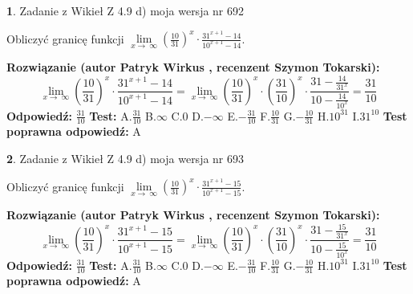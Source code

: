 \documentclass[12pt, a4paper]{article}
\theoremstyle{definition} %
\newtheorem{zad}{}
\newcommand{\zadStart}[1]{\begin{zad}#1\newline}
\newcommand{\zadStop}{\end{zad}}
\newcommand{\rozwStart}[2]{\noindent \textbf{Rozwiązanie (autor #1 , recenzent #2): }\newline}
\newcommand{\rozwStop}{\newline}
\newcommand{\odpStart}{\noindent \textbf{Odpowiedź:}\newline}
\newcommand{\odpStop}{\newline}
\newcommand{\testStart}{\noindent \textbf{Test:}\newline}
\newcommand{\testStop}{\newline}
\newcommand{\kluczStart}{\noindent \textbf{Test poprawna odpowiedź:}\newline}
\newcommand{\kluczStop}{\newline}
\begin{document}
\zadStart{Zadanie z Wikieł Z 4.9 d) moja wersja nr 692}


Obliczyć granicę funkcji  $\lim\limits_{x\to\ \infty}(\frac{10}{31})^{x}\cdot\frac{31^{x+1}-14}{10^{x+1}-14}$.
\zadStop
\rozwStart{Patryk Wirkus}{Szymon Tokarski}
$$\lim\limits_{x\to\ \infty}(\frac{10}{31})^{x}\cdot\frac{31^{x+1}-14}{10^{x+1}-14}=\lim\limits_{x\to\ \infty}(\frac{10}{31})^{x}\cdot(\frac{31}{10})^{x} \cdot \frac{31-\frac{14}{31^{x}}}{10-\frac{14}{10^{x}}} = \frac{31}{10}$$
\rozwStop
\odpStart
$\frac{31}{10}$
\odpStop
\testStart
A.$\frac{31}{10}$ B.$\infty$ C.$0$ D.$-\infty$ E.$-\frac{31}{10}$
F.$\frac{10}{31}$ G.$-\frac{10}{31}$
H.$10^{31}$
I.$31^{10}$
\testStop
\kluczStart
A
\kluczStop



\zadStart{Zadanie z Wikieł Z 4.9 d) moja wersja nr 693}


Obliczyć granicę funkcji  $\lim\limits_{x\to\ \infty}(\frac{10}{31})^{x}\cdot\frac{31^{x+1}-15}{10^{x+1}-15}$.
\zadStop
\rozwStart{Patryk Wirkus}{Szymon Tokarski}
$$\lim\limits_{x\to\ \infty}(\frac{10}{31})^{x}\cdot\frac{31^{x+1}-15}{10^{x+1}-15}=\lim\limits_{x\to\ \infty}(\frac{10}{31})^{x}\cdot(\frac{31}{10})^{x} \cdot \frac{31-\frac{15}{31^{x}}}{10-\frac{15}{10^{x}}} = \frac{31}{10}$$
\rozwStop
\odpStart
$\frac{31}{10}$
\odpStop
\testStart
A.$\frac{31}{10}$ B.$\infty$ C.$0$ D.$-\infty$ E.$-\frac{31}{10}$
F.$\frac{10}{31}$ G.$-\frac{10}{31}$
H.$10^{31}$
I.$31^{10}$
\testStop
\kluczStart
A
\kluczStop
\end{document}

